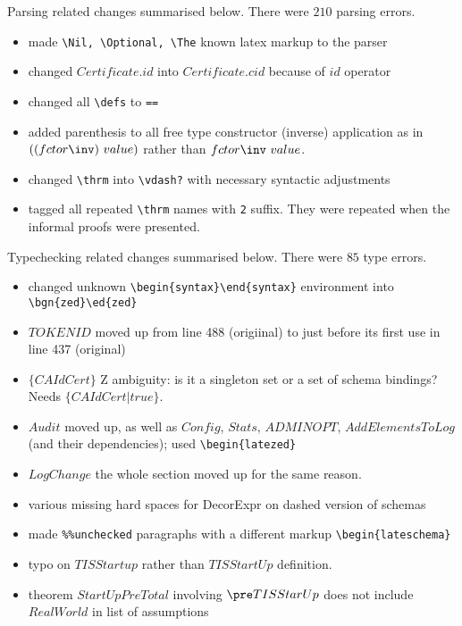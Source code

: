 Parsing related changes summarised below. There were $210$ parsing errors.
\begin{itemize}
   \item made \verb'\Nil, \Optional, \The' known latex markup to the parser
   \item changed $Certificate.id$ into $Certificate.cid$ because of $id$ operator
   \item changed all \verb'\defs' to \verb'=='
   \item added parenthesis to all free type constructor (inverse) application as
   	 in  $((fctor\inv)~value)$ rather than $fctor\inv~ value$.
   \item changed \verb'\thrm' into \verb'\vdash?' with necessary syntactic adjustments
   \item tagged all repeated \verb'\thrm' names with \verb'2' suffix. They were
   	 repeated when the informal proofs were presented.
\end{itemize}

Typechecking related changes summarised below. There were $85$ type errors.
\begin{itemize}
   \item changed unknown \verb'\begin{syntax}\end{syntax}' environment into \verb'\bgn{zed}\ed{zed}'
   \item $TOKENID$ moved up from line 488 (origiinal) to just before its first use in line 437 (original)
   \item $\{ CAIdCert \}$ Z ambiguity: is it a singleton set or a set of schema bindings? Needs $\{ CAIdCert | true \}$.
   \item $Audit$ moved up, as well as $Config$, $Stats$, $ADMINOPT$, $AddElementsToLog$ (and their dependencies); used \verb'\begin{latezed}'
   \item $LogChange$ the whole section moved up for the same reason.
   \item various missing hard spaces for DecorExpr on dashed version of schemas
   \item made \verb'%%unchecked' paragraphs with a different markup \verb'\begin{lateschema}'
   \item typo on $TISStartup$ rather than $TISStartUp$ definition.
   \item theorem $StartUpPreTotal$ involving $\pre TISStarUp$ does not include $RealWorld$ in list of assumptions 
\end{itemize}


